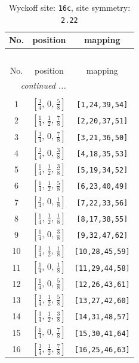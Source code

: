 \documentclass[fleqn,8pt]{jsarticle}
\begin{document}
\begin{longtable}{ccc}
\caption{Wyckoff site: {\tt 16c}, site symmetry: {\tt 2.22}}
 \\
 \hline \hline
No. & position & mapping \\ \hline \endfirsthead

\multicolumn{2}{l}{\tablename\ \thetable{}} \\
 \hline \hline
No. & position & mapping \\ \hline \endhead

 \hline \hline
\multicolumn{2}{r}{\footnotesize\it continued ...} \\ \endfoot

 \hline \hline
\multicolumn{2}{r}{} \\ \endlastfoot

1 & $\left[ \frac{3}{4},\, 0,\, \frac{5}{8} \right]$ & {\tt [1,24,39,54]} \\ \hline
2 & $\left[ \frac{1}{4},\, \frac{1}{2},\, \frac{7}{8} \right]$ & {\tt [2,20,37,51]} \\ \hline
3 & $\left[ \frac{3}{4},\, 0,\, \frac{7}{8} \right]$ & {\tt [3,21,36,50]} \\ \hline
4 & $\left[ \frac{3}{4},\, 0,\, \frac{3}{8} \right]$ & {\tt [4,18,35,53]} \\ \hline
5 & $\left[ \frac{1}{4},\, \frac{1}{2},\, \frac{3}{8} \right]$ & {\tt [5,19,34,52]} \\ \hline
6 & $\left[ \frac{1}{4},\, \frac{1}{2},\, \frac{5}{8} \right]$ & {\tt [6,23,40,49]} \\ \hline
7 & $\left[ \frac{3}{4},\, 0,\, \frac{1}{8} \right]$ & {\tt [7,22,33,56]} \\ \hline
8 & $\left[ \frac{1}{4},\, \frac{1}{2},\, \frac{1}{8} \right]$ & {\tt [8,17,38,55]} \\ \hline
9 & $\left[ \frac{1}{4},\, 0,\, \frac{3}{8} \right]$ & {\tt [9,32,47,62]} \\ \hline
10 & $\left[ \frac{3}{4},\, \frac{1}{2},\, \frac{1}{8} \right]$ & {\tt [10,28,45,59]} \\ \hline
11 & $\left[ \frac{1}{4},\, 0,\, \frac{1}{8} \right]$ & {\tt [11,29,44,58]} \\ \hline
12 & $\left[ \frac{1}{4},\, 0,\, \frac{5}{8} \right]$ & {\tt [12,26,43,61]} \\ \hline
13 & $\left[ \frac{3}{4},\, \frac{1}{2},\, \frac{5}{8} \right]$ & {\tt [13,27,42,60]} \\ \hline
14 & $\left[ \frac{3}{4},\, \frac{1}{2},\, \frac{3}{8} \right]$ & {\tt [14,31,48,57]} \\ \hline
15 & $\left[ \frac{1}{4},\, 0,\, \frac{7}{8} \right]$ & {\tt [15,30,41,64]} \\ \hline
16 & $\left[ \frac{3}{4},\, \frac{1}{2},\, \frac{7}{8} \right]$ & {\tt [16,25,46,63]} \\
\end{longtable}
\end{document}

